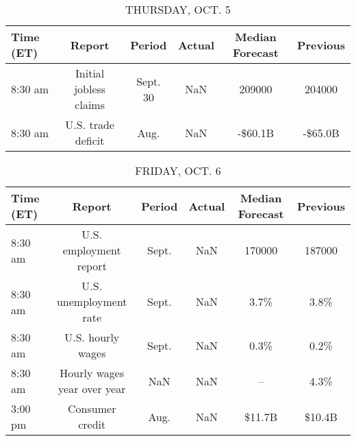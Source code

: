 \documentclass{article}%
\begin{document}
%


\begin{table}[htbp]%
\caption{THURSDAY, OCT. 5}%
\centering%
\begin{adjustbox}{width=1\textwidth}%
\begin{tabular}{lccccc}
\toprule
Time (ET) &                 Report &   Period & Actual & Median Forecast & Previous \\
\midrule
  8:30 am & Initial jobless claims & Sept. 30 &    NaN &          209000 &   204000 \\
  8:30 am &     U.S. trade deficit &     Aug. &    NaN &         -\$60.1B &  -\$65.0B \\
\bottomrule
\end{tabular}
%
\end{adjustbox}%
\end{table}

%


\begin{table}[htbp]%
\caption{FRIDAY, OCT. 6}%
\centering%
\begin{adjustbox}{width=1\textwidth}%
\begin{tabular}{lccccc}
\toprule
Time (ET) &                      Report & Period & Actual & Median Forecast & Previous \\
\midrule
  8:30 am &      U.S. employment report &  Sept. &    NaN &          170000 &   187000 \\
  8:30 am &      U.S. unemployment rate &  Sept. &    NaN &            3.7\% &     3.8\% \\
  8:30 am &           U.S. hourly wages &  Sept. &    NaN &            0.3\% &     0.2\% \\
  8:30 am & Hourly wages year over year &    NaN &    NaN &              -- &     4.3\% \\
  3:00 pm &             Consumer credit &   Aug. &    NaN &          \$11.7B &   \$10.4B \\
\bottomrule
\end{tabular}
%
\end{adjustbox}%
\end{table}
\end{document}
